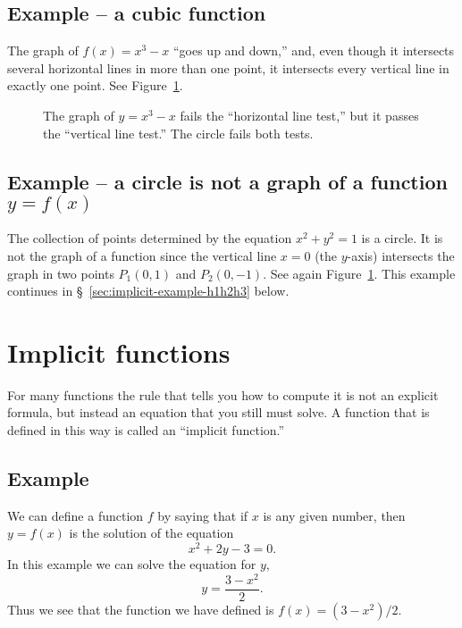 \subsection{Example -- a cubic function} 
The graph of $f(x) = x^3-x$ ``goes up and down,'' and, even though it
intersects several horizontal lines in more than one point, it
intersects every vertical line in exactly one point.  See
Figure~\ref{fig:01horizontal-and-vertical-line-tests}.




\begin{figure}[t]\centering
  \caption{The graph of $y=x^3-x$ fails the ``horizontal line test,'' but it
    passes the ``vertical line test.''  The circle fails both tests.}
  \label{fig:01horizontal-and-vertical-line-tests}
\end{figure}

\subsection{Example -- a circle is not a graph of a function $y=f(x)$} 
\label{sec:01circle-izno-graph}
The collection of points determined by the equation $x^2+y^2=1$ is a circle.  It
is not the graph of a function since the vertical line $x=0$ (the $y$-axis)
intersects the graph in two points $P_1(0,1)$ and $P_2(0,-1)$. See again
Figure~\ref{fig:01horizontal-and-vertical-line-tests}.  This example
continues in \S~\ref{sec:implicit-example-h1h2h3} below.


\section{Implicit functions} 
For many functions the rule that tells you how to compute it is not an explicit
formula, but instead an equation that you still must solve.  A function that is
defined in this way is called an ``implicit function.''  


\subsection{Example} 
We can define a function $f$ by saying that if $x$ is any given number,
then $y = f(x)$ is the solution of the equation
\[
x^2+2y-3=0.
\]
In this example we can solve the equation for $y$,
\[
  y = \frac{3-x^2}{2}.
\]
Thus we see that the function we have defined is $f(x) = (3-x^2)/2$.

